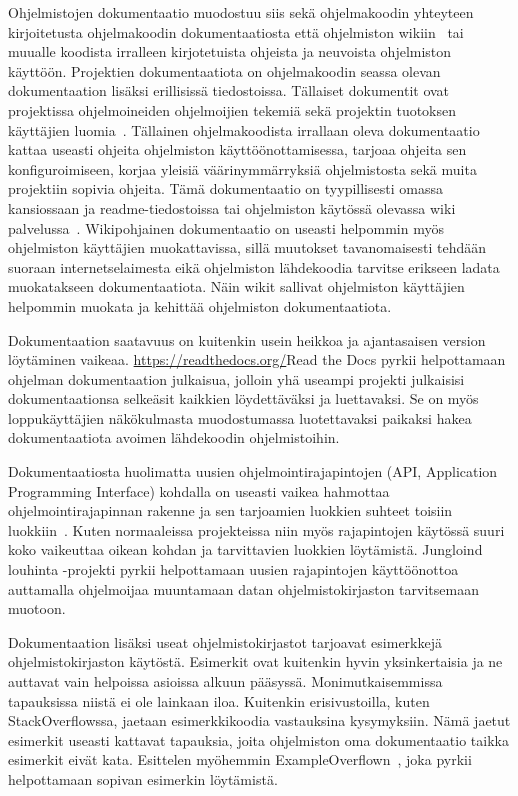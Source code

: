 \documentclass[finnish]{tktltiki2}
\theoremstyle{definition}
\theoremstyle{remark}
\begin{document}
Ohjelmistojen dokumentaatio muodostuu siis sekä ohjelmakoodin yhteyteen kirjoitetusta ohjelmakoodin dokumentaatiosta että ohjelmiston wikiin~\cite{using-wikis-in-sw} tai muualle koodista irralleen kirjotetuista ohjeista ja neuvoista ohjelmiston käyttöön.
Projektien dokumentaatiota on ohjelmakoodin seassa olevan dokumentaation lisäksi erillisissä tiedostoissa. Tällaiset dokumentit ovat projektissa ohjelmoineiden ohjelmoijien tekemiä sekä projektin tuotoksen käyttäjien luomia~\cite{using-wikis-in-sw}.
Tällainen ohjelmakoodista irrallaan oleva dokumentaatio kattaa useasti ohjeita ohjelmiston käyttöönottamisessa, tarjoaa ohjeita sen konfiguroimiseen, korjaa yleisiä väärinymmärryksiä ohjelmistosta sekä muita projektiin sopivia ohjeita. Tämä dokumentaatio on tyypillisesti omassa kansiossaan ja readme-tiedostoissa tai ohjelmiston käytössä olevassa wiki palvelussa~\cite{using-wikis-in-sw}. Wikipohjainen dokumentaatio on useasti helpommin myös ohjelmiston käyttäjien muokattavissa, sillä muutokset tavanomaisesti tehdään suoraan internetselaimesta eikä ohjelmiston lähdekoodia tarvitse erikseen ladata muokatakseen dokumentaatiota. Näin wikit sallivat ohjelmiston käyttäjien helpommin muokata ja kehittää ohjelmiston dokumentaatiota.

Dokumentaation saatavuus on kuitenkin usein heikkoa ja ajantasaisen version löytäminen vaikeaa. \url{https://readthedocs.org/}{Read the Docs} pyrkii helpottamaan ohjelman dokumentaation julkaisua, jolloin yhä useampi projekti julkaisisi dokumentaationsa selkeäsit kaikkien löydettäväksi ja luettavaksi. Se on myös loppukäyttäjien näkökulmasta muodostumassa luotettavaksi paikaksi hakea dokumentaatiota avoimen lähdekoodin ohjelmistoihin.

Dokumentaatiosta huolimatta uusien ohjelmointirajapintojen (API, Application Programming Interface) kohdalla on useasti vaikea hahmottaa ohjelmointirajapinnan rakenne ja sen tarjoamien luokkien suhteet toisiin luokkiin~\cite{jungloid-mining}. Kuten normaaleissa projekteissa niin myös rajapintojen käytössä suuri koko vaikeuttaa oikean kohdan ja tarvittavien luokkien löytämistä. Jungloind louhinta -projekti pyrkii helpottamaan uusien rajapintojen käyttöönottoa auttamalla ohjelmoijaa muuntamaan datan ohjelmistokirjaston tarvitsemaan muotoon.

Dokumentaation lisäksi useat ohjelmistokirjastot tarjoavat esimerkkejä ohjelmistokirjaston käytöstä. Esimerkit ovat kuitenkin hyvin yksinkertaisia ja ne auttavat vain helpoissa asioissa alkuun pääsyssä. Monimutkaisemmissa tapauksissa niistä ei ole lainkaan iloa. Kuitenkin erisivustoilla, kuten StackOverflowssa, jaetaan esimerkkikoodia vastauksina kysymyksiin. Nämä jaetut esimerkit useasti kattavat tapauksia, joita ohjelmiston oma dokumentaatio taikka esimerkit eivät kata. Esittelen myöhemmin ExampleOverflown~\cite{example-overflow-social-media-for-code-recommendations}, joka pyrkii helpottamaan sopivan esimerkin löytämistä.
\end{document}
